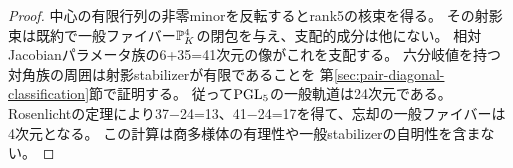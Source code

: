 \begin{proof}
中心の有限行列の非零minorを反転するとrank5の核束を得る。
その射影束は既約で一般ファイバー$\mathbb P^4_K$の閉包を与え、支配的成分は他にない。
相対Jacobianパラメータ族の6+35=41次元の像がこれを支配する。
六分岐値を持つ対角族の周囲は射影stabilizerが有限であることを
第\ref{sec:pair-diagonal-classification}節で証明する。
従って$\mathrm{PGL}_5$の一般軌道は24次元である。
Rosenlichtの定理により37−24=13、41−24=17を得て、忘却の一般ファイバーは4次元となる。
この計算は商多様体の有理性や一般stabilizerの自明性を含まない。
\end{proof}

